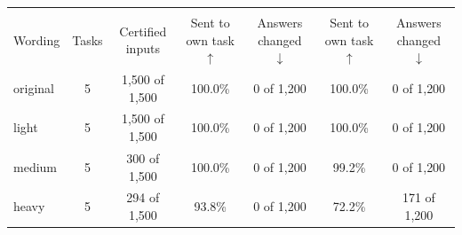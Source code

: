 \begin{tabular}{lcccccc}
    \toprule
    & & \multicolumn{3}{c}{\cert{}} & \multicolumn{2}{c}{\centre{}} \\
    \cmidrule(lr){3-5} \cmidrule(lr){6-7}
    Wording & Tasks & Certified inputs & \shortstack[c]{Sent to own\\task $\uparrow$} & \shortstack[c]{Answers\\changed $\downarrow$} & \shortstack[c]{Sent to own\\task $\uparrow$} & \shortstack[c]{Answers\\changed $\downarrow$} \\
    \midrule
    original & 5 & 1{,}500 of 1{,}500 & 100.0\% & 0 of 1{,}200 & 100.0\% & 0 of 1{,}200 \\
    light & 5 & 1{,}500 of 1{,}500 & 100.0\% & 0 of 1{,}200 & 100.0\% & 0 of 1{,}200 \\
    medium & 5 & 300 of 1{,}500 & 100.0\% & 0 of 1{,}200 & 99.2\% & 0 of 1{,}200 \\
    heavy & 5 & 294 of 1{,}500 & 93.8\% & 0 of 1{,}200 & 72.2\% & 171 of 1{,}200 \\
    \bottomrule
\end{tabular}
